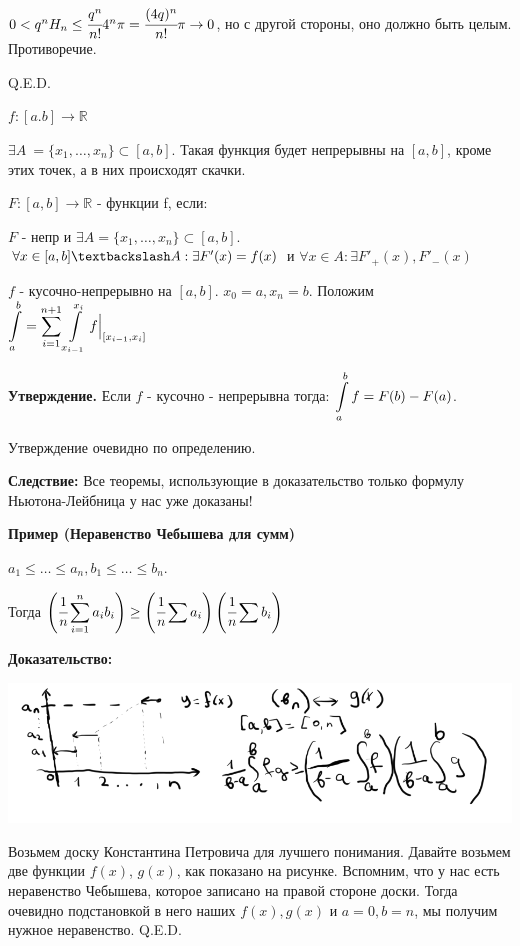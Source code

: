 $0<q^nH_n \leq \cfrac{q^n}{n!}4^n\pi=\cfrac{(4q)^n}{n!}\pi\rightarrow 0$, но с другой стороны, оно должно быть целым. Противоречие.

\hfill Q.E.D.

 $f:[a.b] \rightarrow \mathbb{R}$ 

$\exists A \ = \{x_1,\ldots,x_n\} \subset [a,b]$. Такая функция будет непрерывны на $[a,b]$, кроме этих точек, а в них происходят скачки.


 $F:[a,b] \rightarrow \mathbb{R}$ -  функции f, если:

$F$ - непр и $\exists A = \{x_1,\ldots,x_n\} \subset[a,b]$.
$\forall x \in [a,b] \textbackslash A: \exists F'(x) = f(x)$ и $\forall x \in A: \exists F'_+(x),F'_-(x)$


$f$ - кусочно-непрерывно на $[a,b]$. $x_0 = a, x_n = b$. Положим $\displaystyle\int\limits_{a}^{b} = \sum\limits_{i=1}^{n+1}\displaystyle\int\limits_{x_{i-1}}^{x_i}f\Big|_{[x_{i-1},x_i]}$

\textbf{Утверждение.} Если $f$ - кусочно - непрерывна тогда: $\displaystyle\int\limits_{a}^{b}f=F(b)-F(a)$.

Утверждение очевидно по определению.

\textbf{Следствие:} Все теоремы, использующие в доказательство только формулу Ньютона-Лейбница у нас уже доказаны!

\textbf{Пример (Неравенство Чебышева для сумм)}

$a_1\leq \ldots \leq a_n, b_1\leq \ldots \leq b_n$.

Тогда $\displaystyle\left(\cfrac{1}{n} \sum\limits_{i=1}^na_ib_i\right)\geq \left( \cfrac{1}{n}\sum a_i\right)\left(\cfrac{1}{n}\sum b_i\right)$

\textbf{Доказательство:}
\begin{center}
   \includegraphics[width = 19 cm]{assets/integral_2.png}
\end{center}
Возьмем доску Константина Петровича для лучшего понимания. Давайте возьмем две функции $f(x)$, $g(x)$, как показано на рисунке. Вспомним, что у нас есть неравенство Чебышева, которое записано на правой стороне доски. Тогда очевидно подстановкой в него наших $f(x),g(x)$ и $a=0,b=n$, мы получим нужное неравенство.
\hfill Q.E.D.

